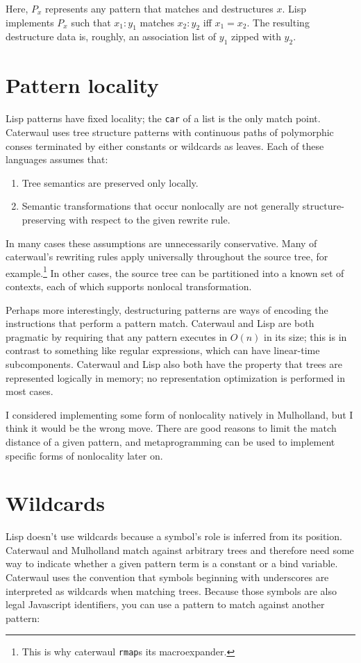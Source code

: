 \documentclass{report}
\begin{document}
  Here, $P_x$ represents any pattern that matches and destructures $x$. Lisp implements $P_x$ such that $x_1:y_1$ matches $x_2:y_2$ iff $x_1 = x_2$. The resulting destructure data is, roughly,
  an association list of $y_1$ zipped with $y_2$.

\section{Pattern locality}
    Lisp patterns have fixed locality; the {\tt car} of a list is the only match point. Caterwaul uses tree structure patterns with continuous paths of polymorphic conses terminated by either
    constants or wildcards as leaves. Each of these languages assumes that:

\begin{enumerate}
\item{Tree semantics are preserved only locally.}
\item{Semantic transformations that occur nonlocally are not generally structure-preserving with respect to the given rewrite rule.}
\end{enumerate}

    In many cases these assumptions are unnecessarily conservative. Many of caterwaul's rewriting rules apply universally throughout the source tree, for example.\footnote{This is why
    caterwaul {\tt rmap}s its macroexpander.} In other cases, the source tree can be partitioned into a known set of contexts, each of which supports nonlocal transformation.

    Perhaps more interestingly, destructuring patterns are ways of encoding the instructions that perform a pattern match. Caterwaul and Lisp are both pragmatic by requiring that any pattern
    executes in $O(n)$ in its size; this is in contrast to something like regular expressions, which can have linear-time subcomponents. Caterwaul and Lisp also both have the property that
    trees are represented logically in memory; no representation optimization is performed in most cases.

    I considered implementing some form of nonlocality natively in Mulholland, but I think it would be the wrong move. There are good reasons to limit the match distance of a given pattern,
    and metaprogramming can be used to implement specific forms of nonlocality later on.

\section{Wildcards}
    Lisp doesn't use wildcards because a symbol's role is inferred from its position. Caterwaul and Mulholland match against arbitrary trees and therefore need some way to indicate whether a
    given pattern term is a constant or a bind variable. Caterwaul uses the convention that symbols beginning with underscores are interpreted as wildcards when matching trees. Because those
    symbols are also legal Javascript identifiers, you can use a pattern to match against another pattern:
\end{document}
